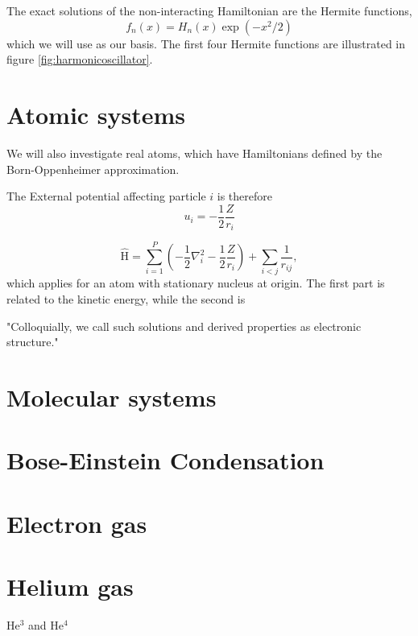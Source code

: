 The exact solutions of the non-interacting Hamiltonian are the Hermite functions, 
\begin{equation}
f_n(x)=H_n(x)\exp(-x^2/2)
\end{equation}
which we will use as our basis. The first four Hermite functions are illustrated in figure \eqref{fig:harmonicoscillator}.

\section{Atomic systems} \label{subsubsec:atomic}
We will also investigate real atoms, which have Hamiltonians defined by the Born-Oppenheimer approximation.

The External potential affecting particle $i$ is therefore
\begin{equation}
u_i=- \frac{1}{2} \frac{Z}{r_i}
\end{equation}


\begin{equation}
\label{eq:AtomicHamiltonian}
\hat{\text{H}} = \sum_{i=1}^{P} (-\frac{1}{2} \nabla_i^2 - \frac{1}{2} \frac{Z}{r_i}) + \sum_{i<j} \frac{1}{r_{ij}},
\end{equation}
which applies for an atom with stationary nucleus at origin. The first part is related to the kinetic energy, while the second is 

"Colloquially, we call such solutions and derived properties as electronic structure."

\section{Molecular systems}

\section{Bose-Einstein Condensation}

\section{Electron gas} \label{subsubsec:electrongas}
\section{Helium gas} \label{subsubsec:heliumgas}
He$^3$ and He$^4$